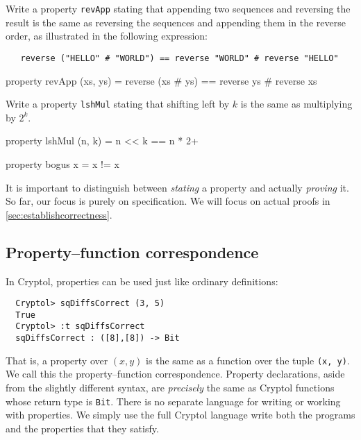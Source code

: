 \begin{Exercise}\label{ex:thm:2}
  Write a property {\tt revApp} stating that appending two sequences
  and reversing the result is the same as reversing the sequences and
  appending them in the reverse order, as illustrated in the following
  expression:\indReverse\indAppend
\begin{Verbatim}
   reverse ("HELLO" # "WORLD") == reverse "WORLD" # reverse "HELLO"
\end{Verbatim}
\end{Exercise}
\begin{Answer}\indReverse\indAppend
\begin{code}
  property revApp (xs, ys) = reverse (xs # ys)
                             == reverse ys # reverse xs
\end{code}
\end{Answer}

\begin{Exercise}\label{ex:thm:3}
  Write a property {\tt lshMul} stating that shifting left by $k$ is
  the same as multiplying by $2^k$.
\end{Exercise}
\begin{Answer}
\begin{code}
  property lshMul (n, k) = n << k == n * 2^^k
\end{code}
\end{Answer}

\begin{code}
  property bogus x = x != x
\end{code}
It is important to distinguish between \emph{stating} a property and
actually \emph{proving} it. So far, our focus is purely on
specification. We will focus on actual proofs in
\autoref{sec:establishcorrectness}.

\subsection{Property--function correspondence}\indThmFuncCorr
\label{sec:prop-funct-corr}

In Cryptol, properties can be used just like ordinary definitions:
\begin{Verbatim}
  Cryptol> sqDiffsCorrect (3, 5)
  True
  Cryptol> :t sqDiffsCorrect
  sqDiffsCorrect : ([8],[8]) -> Bit
\end{Verbatim}
That is, a property over {\tt$(x, y)$} is the same as a function over
the tuple {\tt (x, y)}. We call this the property--function
correspondence. Property declarations, aside from the slightly
different syntax, are \emph{precisely} the same as Cryptol functions
whose return type is \texttt{Bit}. There is no separate language for
writing or working with properties. We simply use the full Cryptol
language write both the programs and the properties that they satisfy.

